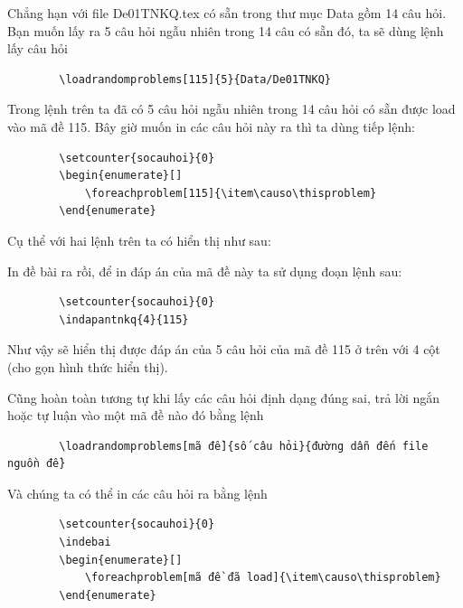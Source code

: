 	Chẳng hạn với file De01TNKQ.tex  có sẵn trong thư mục Data gồm 14 câu hỏi. Bạn muốn lấy ra 5 câu hỏi ngẫu nhiên trong 14 câu có sẵn đó, ta sẽ dùng lệnh lấy câu hỏi
	\begin{verbatim}
		\loadrandomproblems[115]{5}{Data/De01TNKQ}
	\end{verbatim}
	Trong lệnh trên ta đã có 5 câu hỏi ngẫu nhiên trong 14 câu hỏi có sẵn được load vào mã đề 115. Bây giờ muốn in các câu hỏi này ra thì ta dùng tiếp lệnh:
	\begin{verbatim}
		\setcounter{socauhoi}{0}
		\begin{enumerate}[]
			\foreachproblem[115]{\item\causo\thisproblem}
		\end{enumerate}
	\end{verbatim}
	
	Cụ thể với hai lệnh trên ta có hiển thị như sau:
	\setcounter{socauhoi}{0}
	\indebai
	\begin{enumerate}[]
		\foreachproblem[115]{\item\causo\thisproblem}
	\end{enumerate}
	
	In đề bài ra rồi, để in đáp án của mã đề này ta sử dụng đoạn lệnh sau:
	
	\begin{verbatim}
		\setcounter{socauhoi}{0}
		\indapantnkq{4}{115}
	\end{verbatim}
	
	Như vậy sẽ hiển thị được đáp án của 5 câu hỏi của mã đề 115 ở trên với 4 cột (cho gọn hình thức hiển thị).
	
	\setcounter{socauhoi}{0}
	
	Cũng hoàn toàn tương tự khi lấy các câu hỏi định dạng đúng sai, trả lời ngắn hoặc tự luận vào một mã đề nào đó bằng lệnh 
	
	\begin{verbatim}
		\loadrandomproblems[mã đề]{số câu hỏi}{đường dẫn đến file nguồn đề}
	\end{verbatim}
	
	Và chúng ta có thể in các câu hỏi ra bằng lệnh
	\begin{verbatim}
		\setcounter{socauhoi}{0}
		\indebai
		\begin{enumerate}[]
			\foreachproblem[mã đề đã load]{\item\causo\thisproblem}
		\end{enumerate}
	\end{verbatim}
	
